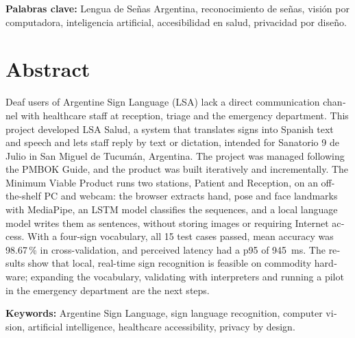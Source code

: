 \medskip
\noindent\textbf{Palabras clave:} Lengua de Señas Argentina, reconocimiento de señas, visión por computadora, inteligencia artificial, accesibilidad en salud, privacidad por diseño.

\chapter*{Abstract}
\begin{otherlanguage}{english}
Deaf users of Argentine Sign Language (LSA) lack a direct communication channel with healthcare staff at reception, triage and the emergency department. This project developed LSA Salud, a system that translates signs into Spanish text and speech and lets staff reply by text or dictation, intended for Sanatorio 9 de Julio in San Miguel de Tucumán, Argentina. The project was managed following the PMBOK Guide, and the product was built iteratively and incrementally. The Minimum Viable Product runs two stations, Patient and Reception, on an off-the-shelf PC and webcam: the browser extracts hand, pose and face landmarks with MediaPipe, an LSTM model classifies the sequences, and a local language model writes them as sentences, without storing images or requiring Internet access. With a four-sign vocabulary, all 15 test cases passed, mean accuracy was 98.67\,\% in cross-validation, and perceived latency had a p95 of 945~ms. The results show that local, real-time sign recognition is feasible on commodity hardware; expanding the vocabulary, validating with interpreters and running a pilot in the emergency department are the next steps.

\medskip
\noindent\textbf{Keywords:} Argentine Sign Language, sign language recognition, computer vision, artificial intelligence, healthcare accessibility, privacy by design.
\end{otherlanguage}
